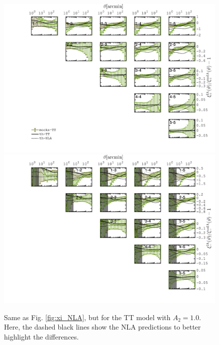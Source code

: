 \documentclass[useAMS,usenatbib]{mn2e}
\begin{document}
\begin{figure}
\includegraphics[width=\columnwidth]{graphs/frac_xip_IA1_skysim_TT_srd.jpg}
\includegraphics[width=\columnwidth]{graphs/frac_xim_IA1_skysim_TT_srd.jpg}
\caption{Same as Fig. \ref{fig:xi_NLA}, but for the TT model with $A_2=1.0$. Here, the dashed black lines show the NLA predictions to better highlight the differences. }
\label{fig:xi_TT}
\end{figure}
\end{document}
